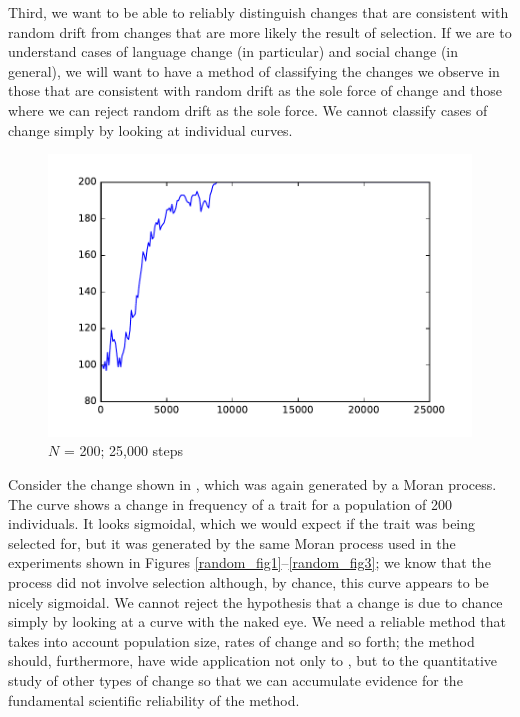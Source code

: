\documentclass[output=paper]{langsci/langscibook}
\begin{document}
Third, we want to be able to reliably distinguish changes that are
consistent with random drift from changes that are more likely the
result of selection.  If we are to understand cases of language change
(in particular) and social change (in general), we will want to have
a method of classifying the changes we observe in those that are
consistent with random drift as the sole force of change and those
where we can reject random drift as the sole force.   We cannot
classify cases of change simply by looking at individual curves.

\begin{figure}[ht]
    \centering
    \includegraphics[width=.8\linewidth]{./img/result.pdf}
    \caption{$N$ = 200; 25,000 steps}
    \label{RandomDrift}
\end{figure}

Consider the change shown in , which was again
generated by a Moran process.  The curve shows a change in frequency
of a trait for a population of 200 individuals. It looks sigmoidal,
which we would expect if the trait was being selected for, but it was
generated by the same Moran process used in the experiments shown in
Figures \ref{random_fig1}--\ref{random_fig3}; we know that the process
did not involve selection although, by chance, this curve appears to
be nicely sigmoidal.  We cannot reject the hypothesis that a change is
due to chance simply by looking at a curve with the naked eye.  We
need a reliable method that takes into account population size, rates
of change and so forth; the method should, furthermore, have wide
application not only to , but to the quantitative study
of other types of change so that we can accumulate evidence for the
fundamental scientific reliability of the method.
\end{document}
